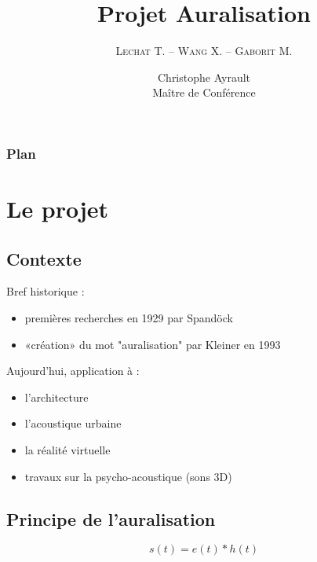 \documentclass{beamer}
\title[Projet Auralisation]{Projet Auralisation}
\institute{L2 SPI TD2\\Novembre 2012 -- Janvier 2013}
\author{\textsc{Lechat} T. -- \textsc{Wang} X. -- \textsc{Gaborit} M.}
\date{Christophe Ayrault\\Maître de Conférence\\\bigskip\scalebox{2}{\insertlogo}}
\begin{document}
\begin{frame}
\titlepage
\end{frame}

\begin{frame}
\frametitle{Plan}
\tableofcontents
\end{frame}

\section{Le projet}
\subsection{Contexte}

\begin{frame}

Bref historique :
\begin{itemize}
    \item premières recherches en 1929 par Spandöck
    \item «création» du mot "auralisation" par Kleiner en 1993
\end{itemize}

Aujourd'hui, application à :

\begin{itemize}
    \item l'architecture
    \item l'acoustique urbaine
    \item la réalité virtuelle
    \item travaux sur la psycho-acoustique (sons 3D)
\end{itemize}

\end{frame}

\subsection{Principe de l'auralisation}

\begin{frame}

\begin{figure}
\end{figure}

\begin{equation*}
s(t) = e(t)\ast h(t)
\end{equation*}

\end{frame}
\end{document}

